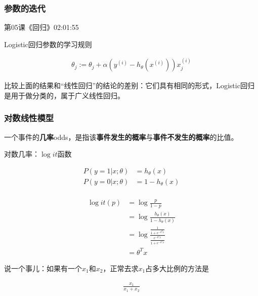 \documentclass[UTF8]{ctexbook}
\begin{document}
\subsubsection{参数的迭代}

第05课《回归》02:01:55

Logistic回归参数的学习规则

\begin{equation}
\begin{aligned}
\theta_{j} := \theta_{j} + \alpha (y^{(i)}-h_{\theta}(x^{(i)}))x^{(i)}_{j}
\end{aligned}
\end{equation}

比较上面的结果和“线性回归”的结论的差别：它们具有相同的形式，Logistic回归是用于做分类的，属于广义线性回归。

\subsubsection{对数线性模型}

一个事件的\textbf{几率}odds，是指该\textbf{事件发生的概率}与\textbf{事件不发生的概率}的比值。

对数几率：$\log it$函数

 \begin{equation}
\begin{aligned}
P(y=1|x;\theta)&=h_{\theta}(x)\\
P(y=0|x;\theta)&=1-h_{\theta}(x)\\
\end{aligned}
\end{equation}

\begin{equation}
\begin{aligned}
\log it(p) &= \log \frac{p}{1-p}\\
&= \log \frac{h_{\theta}(x)}{1-h_{\theta}(x)}\\
&=\log \frac{\frac{1}{1+e^{-\theta^{T}x}}}{\frac{e^{-\theta^{T}x}}{1+e^{-\theta^{T}x}}}\\
&= \theta^{T}x
\end{aligned}
\end{equation}

说一个事儿：如果有一个$x_{1}$和$x_{2}$，正常去求$x_{1}$占多大比例的方法是

\begin{equation}
\begin{aligned}
\frac{x_{1}}{x_{1}+x_{2}}
\end{aligned}
\end{equation}
\end{document}
